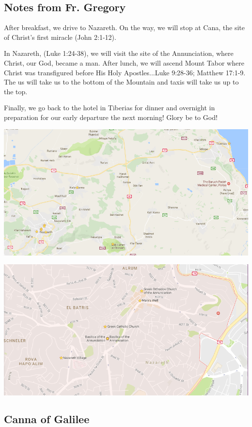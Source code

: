 \documentclass[letterpaper]{report}
\begin{document}
\subsection{Notes from Fr. Gregory}
After breakfast, we drive to Nazareth.
On the way, we will stop at Cana, the site of Christ's first miracle
(John 2:1-12).

In Nazareth, (Luke 1:24-38), we will visit the site of the Annunciation,
where Christ, our God, became a man.
After lunch, we will ascend Mount Tabor where Christ was transfigured before
His Holy Apostles...Luke 9:28-36; Matthew 17:1-9. 
The us will take us to the bottom of the Mountain and taxis will take us up to
the top.

Finally, we go back to the hotel in Tiberias for dinner and overnight in
preparation for our early departure the next morning! Glory be to God!

\includegraphics[width=\textwidth]{TiberiasCanaNazarethTabor}

\includegraphics[width=\textwidth]{Nazareth}


\clearpage
\subsection{Canna of Galilee}
\begin{multicols}{2}
	\mbox{}
\end{multicols}
\end{document}
